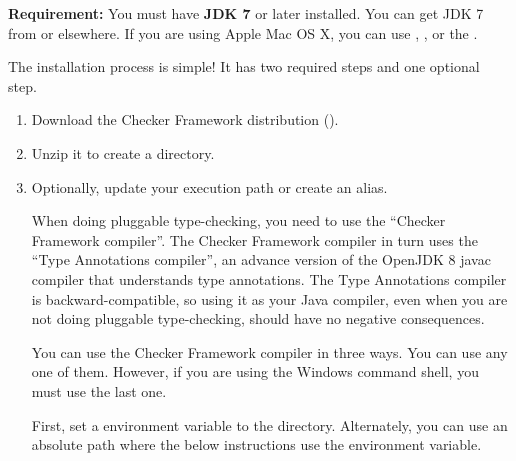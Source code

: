 \textbf{Requirement:}
You must have \textbf{JDK 7} or later installed.  You can get JDK 7 from
or elsewhere.  If you are using Apple Mac OS X, you can use
,
,
or the .

The installation process is simple!  It has two required steps and one
optional step.
\begin{enumerate}
\item
  Download the Checker Framework distribution
  ().
\item 
  Unzip it to create a  directory.


\item
  Optionally, update your execution path or create an alias.

  When doing pluggable type-checking, you need to use the ``Checker
  Framework compiler''.  The Checker Framework compiler in turn uses the
  ``Type Annotations compiler'', an advance version of the OpenJDK 8 javac
  compiler that understands type annotations.  The Type Annotations
  compiler is backward-compatible, so using it as your Java compiler, even
  when you are not doing pluggable type-checking, should have no negative
  consequences.

  You can use the Checker Framework compiler in three ways.  You can use any one of them.  However, if
  you are using the Windows command shell, you must use the last one.

  First, set a  environment variable to the
   directory.  Alternately, you can
  use an absolute path where the below instructions use the 
  environment variable.


\end{enumerate}
